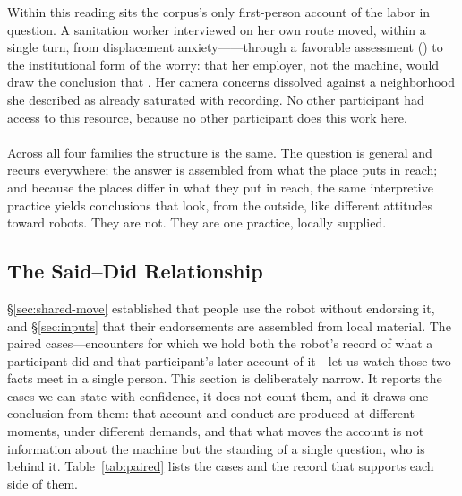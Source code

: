Within this reading sits the corpus's only first-person account of the labor in
question. A sanitation worker interviewed on her own route moved, within a single
turn, from displacement anxiety------through a favorable assessment
() to the institutional
form of the worry: that her employer, not the machine, would draw the conclusion
that . Her camera concerns dissolved
against a neighborhood she described as already saturated with recording. No
other participant had access to this resource, because no other participant does
this work here.

\paragraph{}
Across all four families the structure is the same. The question is general and
recurs everywhere; the answer is assembled from what the place puts in reach; and
because the places differ in what they put in reach, the same interpretive
practice yields conclusions that look, from the outside, like different attitudes
toward robots. They are not. They are one practice, locally supplied.

\subsection{The Said--Did Relationship}
\label{sec:said-did}

\S\ref{sec:shared-move} established that people use the robot without endorsing
it, and \S\ref{sec:inputs} that their endorsements are assembled from local
material. The paired cases---encounters for which we hold both the robot's
record of what a participant did and that participant's later account of
it---let us watch those two facts meet in a single person. This section is
deliberately narrow. It reports the cases we can state with confidence, it does
not count them, and it draws one conclusion from them: that account and conduct
are produced at different moments, under different demands, and that what moves
the account is not information about the machine but the standing of a single
question, who is behind it. Table~\ref{tab:paired} lists the cases and the
record that supports each side of them.

